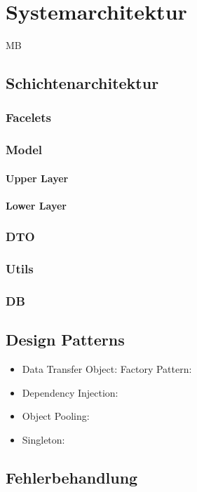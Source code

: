 \chapter{Systemarchitektur}
\begin{tiny}
MB \\
\end{tiny}
\section{Schichtenarchitektur}
    \subsection{Facelets}
    	\subsection{Model}
    	\subsubsection{Upper Layer}
    \subsubsection{Lower Layer}
    \subsection{DTO}
    \subsection{Utils}
    \subsection{DB}
\section{Design Patterns}
	\begin{itemize}
		\item Data Transfer Object:
		\ten Factory Pattern:
		\item Dependency Injection:
		\item Object Pooling:
		\item Singleton:
	\end{itemize}
\section{Fehlerbehandlung}		     

